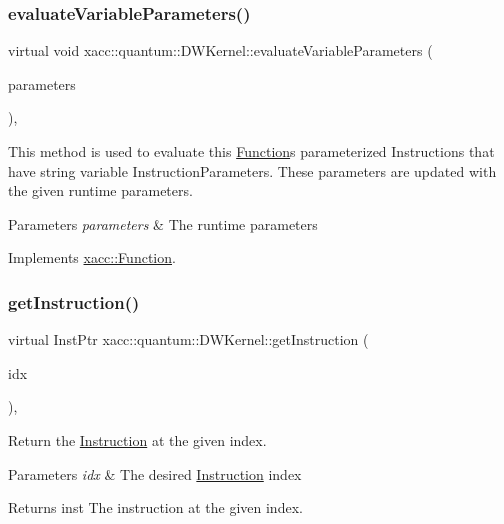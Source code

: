 \subsubsection{\texorpdfstring{evaluate\+Variable\+Parameters()}{evaluateVariableParameters()}}
{\footnotesize\ttfamily virtual void xacc\+::quantum\+::\+D\+W\+Kernel\+::evaluate\+Variable\+Parameters (\begin{DoxyParamCaption}\item[{std\+::vector$<$ Instruction\+Parameter $>$}]{parameters }\end{DoxyParamCaption})\hspace{0.3cm}{\ttfamily [inline]}, {\ttfamily [virtual]}}

This method is used to evaluate this \hyperlink{a01151}{Function}\textquotesingle{}s parameterized Instructions that have string variable Instruction\+Parameters. These parameters are updated with the given runtime parameters.


\begin{DoxyParams}{Parameters}
{\em parameters} & The runtime parameters \\
\hline
\end{DoxyParams}


Implements \hyperlink{a01151_af6ae9453027789a2aaec30e59c9e45e3}{xacc\+::\+Function}.

\mbox{\label{a00983_a00f23cd2e15ea6b9d00d4f3dbe1540f8}} 
\subsubsection{\texorpdfstring{get\+Instruction()}{getInstruction()}}
{\footnotesize\ttfamily virtual Inst\+Ptr xacc\+::quantum\+::\+D\+W\+Kernel\+::get\+Instruction (\begin{DoxyParamCaption}\item[{const int}]{idx }\end{DoxyParamCaption})\hspace{0.3cm}{\ttfamily [inline]}, {\ttfamily [virtual]}}

Return the \hyperlink{a01155}{Instruction} at the given index.


\begin{DoxyParams}{Parameters}
{\em idx} & The desired \hyperlink{a01155}{Instruction} index \\
\hline
\end{DoxyParams}
\begin{DoxyReturn}{Returns}
inst The instruction at the given index. 
\end{DoxyReturn}


